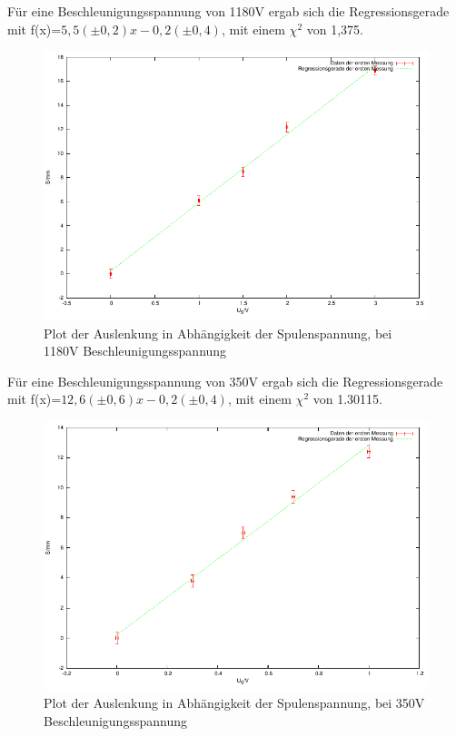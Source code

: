 \documentclass[12pt]{scrartcl}
\begin{document}
Für eine Beschleunigungsspannung von 1180V ergab sich die Regressionsgerade mit f(x)=$5,5 (\pm 0,2) x  - 0,2 (\pm 0,4)$, mit einem $\chi^2$ von 1,375.

\begin{figure}[htbp] 
  \centering
    \includegraphics[scale = 1]{b_2.pdf}
  	\caption[Plot der Auslenkung in Abhängigkeit der Spulenspannung, bei 1180V Beschleunigungsspannung]{Plot der Auslenkung in Abhängigkeit der Spulenspannung, bei 1180V Beschleunigungsspannung}
  \label{fig:x_1}
\end{figure}
\newpage
Für eine Beschleunigungsspannung von 350V ergab sich die Regressionsgerade mit f(x)=$12,6 (\pm 0,6) x  - 0,2 (\pm 0,4)$, mit einem $\chi^2$ von 1.30115.

\begin{figure}[htbp] 
  \centering
    \includegraphics[scale = 1]{b_3.pdf}
  	\caption[Plot der Auslenkung in Abhängigkeit der Spulenspannung, bei 350V Beschleunigungsspannung]{Plot der Auslenkung in Abhängigkeit der Spulenspannung, bei 350V Beschleunigungsspannung}
  \label{fig:x_1}
\end{figure}
\end{document}
